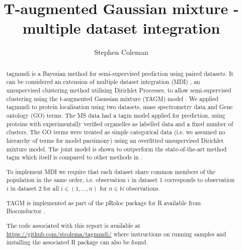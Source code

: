 \documentclass[11pt]{article} %
\title{T-augmented Gaussian mixture - multiple dataset integration}
\author{Stephen Coleman}
\providecommand{\keywords}[1]
{
  \small	
  \textbf{\textit{Keywords---}} #1
}
\begin{document}
 \pgfplotsset{compat=1.16}
\maketitle

\begin{abstract}
tagmmdi is a Bayesian method for semi-supervised prediction using paired datasets. It can be considered an extension of multiple dataset integration (MDI) \cite{kirkBayesianCorrelatedClustering2012}, an unsupervised clustering method utilising Dirichlet Processes, to allow semi-supervised clustering using the t-augmented Gaussian mixture (TAGM) model \cite{CrookBayesianMixtureModelling2018a}. We applied tagmmdi to protein localisation using two datasets, mass spectrometry data and Gene ontology (GO) terms. The MS data had a tagm model applied for prediction, using proteins with experimentally verified organelles as labelled data and a fixed number of clusters. The GO terms were treated as simple categorical data (i.e. we assumed no hierarchy of terms for model parsimony) using an overfitted unsupervised Dirichlet mixture model. The joint model is shown to outperform the state-of-the-art method tagm which itself is compared to other methods in \citet{CrookBayesianMixtureModelling2018a}.

To implement MDI we require that each dataset share common members of the population in the same order, i.e. observation $i$ in dataset 1 corresponds to observation $i$ in dataset 2 for all $i \in (1, \ldots, n)$ for $n \in \mathbb{N}$ observations.

TAGM is implemented as part of the pRoloc package for R available from Bioconductor \cite{Breckelsbioconductorworkflowprocessing2016}.

The code associated with this report is available at \url{https://github.com/stcolema/tagmmdi/} where instructions on running samples and installing the associated R package can also be found.

\end{abstract}

\maketitle

\end{document}
